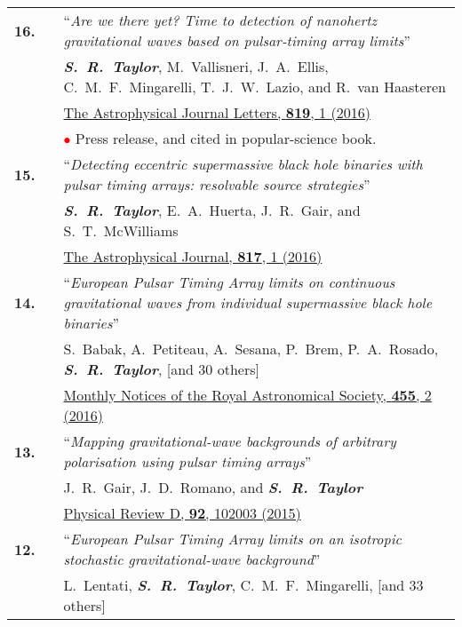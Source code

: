 \documentclass[11pt,letterpaper,sans]{moderncv}
\begin{document}
{\begin{longtable}{rp{0.3cm}p{15.8cm}}
\textbf{16.} & & ``\textit{Are we there yet? Time to detection of nanohertz gravitational waves based on pulsar-timing array limits}'' \\ 
&& \textit{\textbf{S.~R.~Taylor}}, M.~Vallisneri, J.~A.~Ellis, C.~M.~F.~Mingarelli, T.~J.~W.~Lazio, and R.~van Haasteren \\ 
&&  \href{http://iopscience.iop.org/article/10.3847/2041-8205/819/1/L6/meta}{{\color{color1} The Astrophysical Journal Letters, \textbf{819}, 1 (2016)}} \\
&& \textcolor{red}{$\bullet$} Press release, and cited in popular-science book. \vspace{0.09cm}\\
\textbf{15.} & & ``\textit{Detecting eccentric supermassive black hole binaries with pulsar timing arrays: resolvable source strategies}'' \\ 
&& \textit{\textbf{S.~R.~Taylor}}, E.~A.~Huerta, J.~R.~Gair, and S.~T.~McWilliams \\ 
&& \href{http://iopscience.iop.org/article/10.3847/0004-637X/817/1/70/meta}{{\color{color1} The Astrophysical Journal, \textbf{817}, 1 (2016)}} \vspace{0.09cm}\\
\textbf{14.} & & ``\textit{European Pulsar Timing Array limits on continuous gravitational waves from individual supermassive black hole binaries}'' \\ 
&& S.~Babak, A.~Petiteau, A.~Sesana, P.~Brem, P.~A.~Rosado, \textit{\textbf{S.~R.~Taylor}}, [and 30 others] \\ 
&& \href{http://mnras.oxfordjournals.org/content/455/2/1665}{{\color{color1} Monthly Notices of the Royal Astronomical Society, \textbf{455}, 2 (2016)}} \vspace{0.09cm}\\
\textbf{13.} & & ``\textit{Mapping gravitational-wave backgrounds of arbitrary polarisation using pulsar timing arrays}'' \\ 
&& J.~R.~Gair, J.~D.~Romano, and \textit{\textbf{S.~R.~Taylor}} \\ 
&& \href{http://journals.aps.org/prd/abstract/10.1103/PhysRevD.92.102003}{{\color{color1} Physical Review D, \textbf{92}, 102003 (2015)}} \vspace{0.09cm}\\
\textbf{12.} & & ``\textit{European Pulsar Timing Array limits on an isotropic stochastic gravitational-wave background}'' \\ 
&& L.~Lentati, \textit{\textbf{S.~R.~Taylor}}, C.~M.~F.~Mingarelli, [and 33 others] \\ 

\end{longtable}}
\end{document}
